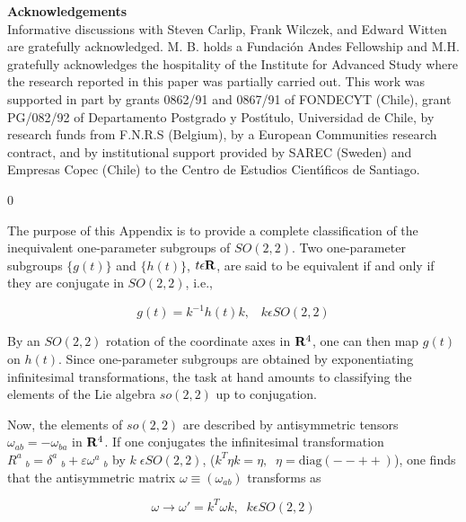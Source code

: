 \documentclass[12pt]{article}
\newcounter{c1} \newcounter{c2}
\renewcommand{\theequation}{\thesection.\arabic{equation}}
\newcommand{\bb}{\begin{equation}}
\newcommand{\ee}{\end{equation}}
\begin{document}
\newpage
{\bf Acknowledgements}\\

Informative discussions with Steven Carlip, Frank Wilczek,
and Edward Witten are gratefully acknowledged. M. B. holds
a Fundaci\'on Andes Fellowship and M.H. gratefully
acknowledges the hospitality of the Institute for Advanced
Study where the research reported in this paper was
partially carried out.  This work was supported in part by
grants 0862/91 and 0867/91 of FONDECYT (Chile), grant PG/082/92
of Departamento Postgrado y Post\'{\i}tulo, Universidad de Chile,
by research funds from F.N.R.S (Belgium), by a European Communities research
contract, and by
institutional support provided by SAREC (Sweden) and
Empresas Copec (Chile) to the Centro de Estudios
Cient\'{\i}ficos de Santiago.







\newpage
{}


\renewcommand{\theequation}{A.\arabic{equation}}
\setcounter{equation} 0
%

The purpose of this Appendix is to provide a complete
classification of the inequivalent one-parameter subgroups of
$SO(2,2)$. Two one-parameter subgroups $\{g(t)\}$ and
$\{h(t)\}$,  $t\epsilon {\bf R}$, are said to be equivalent if
and only if they are conjugate in $SO(2,2)$, i.e.,

\bb
g(t)= k^{-1}h(t)k,\;\;\; k\epsilon SO(2,2)
\label{a.1}
\ee

By an $SO(2,2)$ rotation of the coordinate axes in ${\bf R}^4$,
one can then map $g(t)$ on $h(t)$. Since one-parameter subgroups are
obtained by exponentiating infinitesimal transformations, the
task at hand amounts to classifying the elements of the Lie
algebra $so(2,2)$ up to conjugation.

Now, the elements of $so(2,2)$ are described by antisymmetric
tensors $\omega_{ab} =-\omega_{ba}$ in ${\bf R}^4$. If one
conjugates the infinitesimal transformation $R^a\;_b =
\delta^a\;_b +\varepsilon \omega^a\;_b$ by $k \; \epsilon
SO(2,2)$, ($k^T \eta k = \eta,\;\; \eta= \mbox{diag}(--++)$),
one finds that the antisymmetric matrix $\omega \equiv
(\omega_{ab})$ transforms as

\bb
\omega\rightarrow  \omega'= k^T \omega k,\;\;k \epsilon SO(2,2)
\label{a.2}
\ee
\end{document}

